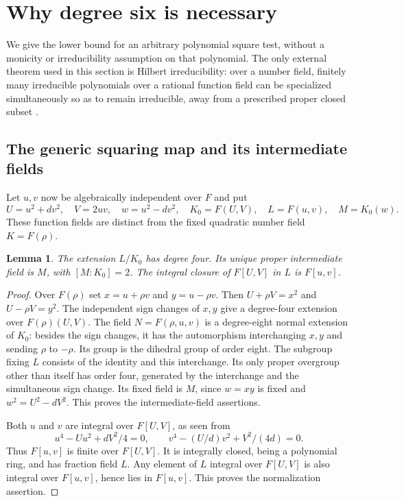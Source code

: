 \documentclass[11pt,a4paper]{article}
\newtheorem{lemma}[theorem]{Lemma}
\begin{document}
\section{Why degree six is necessary}\label{sec:optimality}

We give the lower bound for an arbitrary polynomial square test,
without a monicity or irreducibility assumption on that polynomial.
The only external theorem used in this section is Hilbert irreducibility:
over a number field, finitely many irreducible polynomials over a
rational function field can be specialized simultaneously so as to
remain irreducible, away from a prescribed proper closed subset
\cite[Proposition~3.3.5 and Theorem~3.4.1]{Serre}.

\subsection{The generic squaring map and its intermediate fields}

Let $u,v$ now be algebraically independent over $F$ and put
\[
 U=u^2+dv^2,\quad V=2uv,\quad w=u^2-dv^2,
 \quad K_0=F(U,V),\quad L=F(u,v),\quad M=K_0(w).
\]
These function fields are distinct from the fixed quadratic number field
$K=F(\rho)$.

\begin{lemma}\label{lem:fields}
The extension $L/K_0$ has degree four. Its unique proper intermediate
field is $M$, with $[M:K_0]=2$. The integral closure of $F[U,V]$ in $L$
is $F[u,v]$.
\end{lemma}
\begin{proof}
Over $F(\rho)$ set $x=u+\rho v$ and $y=u-\rho v$. Then
$U+\rho V=x^2$ and $U-\rho V=y^2$. The independent sign changes
of $x,y$ give a degree-four extension over $F(\rho)(U,V)$.
The field $N=F(\rho,u,v)$ is a degree-eight normal extension of $K_0$:
besides the sign changes, it has the automorphism interchanging $x,y$
and sending $\rho$ to $-\rho$. Its group is the dihedral group of order
eight. The subgroup fixing $L$ consists of the identity and this
interchange. Its only proper overgroup other than itself has order four,
generated by the interchange and the simultaneous sign change.
Its fixed field is $M$, since $w=xy$ is fixed and
$w^2=U^2-dV^2$. This proves the intermediate-field assertions.

Both $u$ and $v$ are integral over $F[U,V]$, as seen from
\[
 u^4-Uu^2+dV^2/4=0,\qquad
 v^4-(U/d)v^2+V^2/(4d)=0.
\]
Thus $F[u,v]$ is finite over $F[U,V]$. It is integrally closed, being
a polynomial ring, and has fraction field $L$. Any element of $L$
integral over $F[U,V]$ is also integral over $F[u,v]$, hence lies in
$F[u,v]$. This proves the normalization assertion.
\end{proof}
\end{document}
